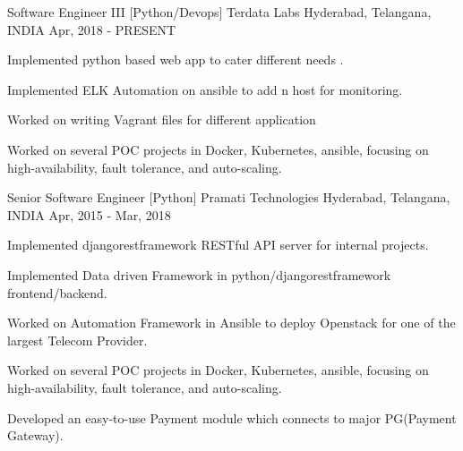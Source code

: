 

\begin{cventries}

  \cventry
    {Software Engineer III [Python/Devops]} %
    {Terdata Labs} %
    {Hyderabad, Telangana, INDIA} %
    {Apr, 2018 - PRESENT} %
    {
      \begin{cvitems} %
        \item {Implemented python based web app to cater different needs .}
        \item {Implemented ELK Automation on ansible to add n host for monitoring. }
        \item {Worked on writing Vagrant files for different application }
        \item {Worked on several POC projects in Docker, Kubernetes, ansible, focusing on high-availability, fault tolerance, and auto-scaling. }
      \end{cvitems}
    }

  \cventry
    {Senior Software Engineer [Python]} %
    {Pramati Technologies} %
    {Hyderabad, Telangana, INDIA} %
    {Apr, 2015 - Mar, 2018} %
    {
      \begin{cvitems} %
        \item {Implemented djangorestframework RESTful API server for internal projects.}
        \item {Implemented Data driven Framework in python/djangorestframework frontend/backend. }
        \item {Worked on Automation Framework in Ansible to deploy Openstack for one of the largest Telecom Provider. }
        \item {Worked on several POC projects in Docker, Kubernetes, ansible, focusing on high-availability, fault tolerance, and auto-scaling. }
        \item {Developed an easy-to-use Payment module which connects to major PG(Payment Gateway).}
      \end{cvitems}
    }


\end{cventries}
